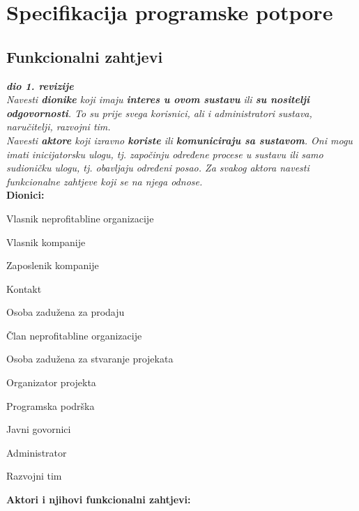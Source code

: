 \chapter{Specifikacija programske potpore}
		
	\section{Funkcionalni zahtjevi}
			
			\textbf{\textit{dio 1. revizije}}\\
			
			\textit{Navesti \textbf{dionike} koji imaju \textbf{interes u ovom sustavu} ili \textbf{su nositelji odgovornosti}. To su prije svega korisnici, ali i administratori sustava, naručitelji, razvojni tim.}\\
				
			\textit{Navesti \textbf{aktore} koji izravno \textbf{koriste} ili \textbf{komuniciraju sa sustavom}. Oni mogu imati inicijatorsku ulogu, tj. započinju određene procese u sustavu ili samo sudioničku ulogu, tj. obavljaju određeni posao. Za svakog aktora navesti funkcionalne zahtjeve koji se na njega odnose.}\\
			
			
			\noindent \textbf{Dionici:}
			
			\begin{packed_enum}
				
				\item Vlasnik neprofitabline organizacije
				\item Vlasnik kompanije
				\item Zaposlenik kompanije
					\item Kontakt
					\item Osoba zadužena za prodaju
				\item Član neprofitabline organizacije
					\item Osoba zadužena za stvaranje projekata
					\item Organizator projekta
					\item Programska podrška
					\item Javni govornici
				\item Administrator
				\item Razvojni tim
				
			\end{packed_enum}
			
			\noindent \textbf{Aktori i njihovi funkcionalni zahtjevi:}
			
